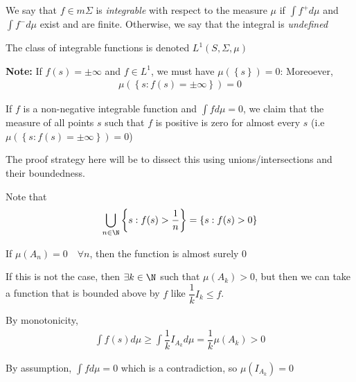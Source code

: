 \par\bigskip
\begin{defo}[Integrable]{}
  We say that $f\in m\Sigma$ is \textit{integrable} with respect to the measure $\mu$ if $\int f^+ d\mu$ and $\int f^- d\mu$ exist and are finite. Otherwise, we say that the integral is \textit{undefined}
  \par\bigskip
  \noindent The class of integrable functions is denoted $L^1(S,\Sigma,\mu)$
\end{defo}
\par\bigskip
\noindent\textbf{Note:} 
\noindent If $f(s) = \pm\infty$ and $f\in L^1$, we must have $\mu(\left\{s\right\}) = 0$: Moreoever,
\begin{equation*}
  \begin{gathered}
  \mu(\left\{s:f(s)=\pm\infty\right\}) = 0
  \end{gathered}
\end{equation*}
\par\bigskip
\begin{lem}[]{}
  If $f$ is a non-negative integrable function and $\int f d\mu = 0$, we claim that the measure of all points $s$ such that $f$ is positive is zero for almost every $s$ (i.e $\mu(\left\{s:f(s)=\pm\infty\right\}) = 0$)
\end{lem}
\par\bigskip
\begin{prf}[]{}
  The proof strategy here will be to dissect this using unions/intersections and their boundedness.\par
  \noindent Note that
  \begin{equation*}
    \begin{gathered}
    \bigcup_{n\in\N}\left\{s:f(s)>\dfrac{1}{n}\right\} = \left\{s:f(s)>0\right\}
    \end{gathered}
  \end{equation*}\par
  \noindent If $\mu(A_n) = 0\quad\forall n$, then the function is almost surely 0\par
  \noindent If this is not the case, then $\exists k\in\N$ such that $\mu(A_k)>0$, but then we can take a function that is bounded above by $f$ like $\dfrac{1}{k}I_k\leq f$.\par
  \noindent By monotonicity, 
  \begin{equation*}
    \begin{gathered}
      \int f(s)d\mu\geq \int\dfrac{1}{k}I_{A_k}d\mu = \dfrac{1}{k}\mu(A_k)>0
    \end{gathered}
  \end{equation*}\par
  \noindent By assumption, $\int f d\mu = 0$ which is a contradiction, so $\mu(I_{A_k}) = 0$
\end{prf}
